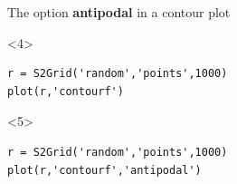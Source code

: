 \documentclass[compress]{beamer}
\begin{document}
\begin{frame}[fragile]
\begin{columns}
\begin{column}{8.5cm}
\begin{overlayarea}{8.5cm}{8cm}
The option \textbf{antipodal} in a contour plot
\begin{onlyenv}<4>
\begin{lstlisting}[style=input]
r = S2Grid('random','points',1000)
plot(r,'contourf')
\end{lstlisting}
\end{onlyenv}
\begin{onlyenv}<5>
\begin{lstlisting}[style=input]
r = S2Grid('random','points',1000)
plot(r,'contourf','antipodal')
\end{lstlisting}
\end{onlyenv}
\end{overlayarea}
\end{column}
  \begin{column}{3.5cm}
  \end{column}
\end{columns}



\end{frame}
\end{document}
